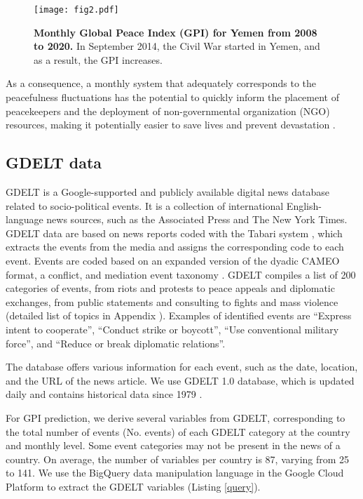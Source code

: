\documentclass{bmcart}
\begin{document}
\begin{figure}[h!]
\centering
\texttt{[image: fig2.pdf]}
\caption{\textbf{Monthly Global Peace Index (GPI) for Yemen from 2008 to 2020.} In September 2014, the Civil War started in Yemen, and as a result, the GPI increases.}
\label{fig:example_YM}
\end{figure}

As a consequence, a monthly system that adequately corresponds to the peacefulness fluctuations has the potential to quickly inform the placement of peacekeepers and the deployment of non-governmental organization (NGO) resources, making it potentially easier to save lives and prevent devastation \cite{hegre2019views}. 

\subsection{GDELT data} 
\label{section:gdelt_data}
GDELT \cite{gdelt_site} is a Google-supported and publicly available digital news database related to socio-political events. 
It is a collection of international English-language news sources, such as the Associated Press and The New York Times. 
GDELT data are based on news reports coded with the Tabari system \cite{best2013analysis}, which extracts the events from the media and assigns the corresponding code to each event. Events are coded based on an expanded version of the dyadic CAMEO format, a conflict, and mediation event taxonomy \cite{schrodt2012cameo}. GDELT compiles a list of 200 categories of events, from riots and protests to peace appeals and diplomatic exchanges, from public statements and consulting to fights and mass violence \cite{schrodt2012cameo} (detailed list of topics in Appendix ). Examples of identified events are ``Express intent to cooperate'', ``Conduct strike or boycott'', ``Use conventional military force'', and ``Reduce or break diplomatic relations''.

The database offers various information for each event, such as the date, location, and the URL of the news article. 
We use GDELT 1.0 database, which is updated daily and contains historical data since 1979 \cite{leetaru2013gdelt}.

For GPI prediction, we derive several variables from GDELT, corresponding to the total number of events (No. events) of each GDELT category at the country and monthly level. 
Some event categories may not be present in the news of a country.
On average, the number of variables per country is 87, varying from 25 to 141. 
We use the BigQuery \cite{fernandes2015what} data manipulation language in the Google Cloud Platform to extract the GDELT variables (Listing \ref{query}).
\end{document}
